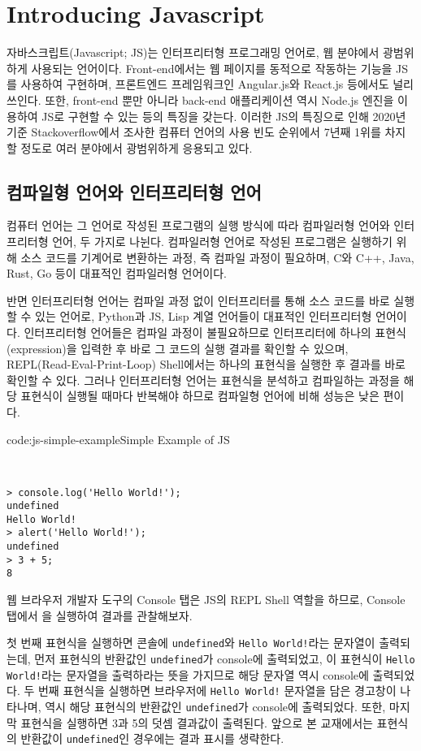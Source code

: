 \section{Introducing Javascript} \label{sect:introducing-javascript}

자바스크립트(Javascript; JS)는 인터프리터형 프로그래밍 언어로, 웹 분야에서 광범위하게 사용되는 언어이다. Front-end에서는 웹 페이지를 동적으로 작동하는 기능을 JS를 사용하여 구현하며, 프론트엔드 프레임워크인 Angular.js와 React.js 등에서도 널리 쓰인다. 또한, front-end 뿐만 아니라 back-end 애플리케이션 역시 Node.js 엔진을 이용하여 JS로 구현할 수 있는 등의 특징을 갖는다. 이러한 JS의 특징으로 인해 2020년 기준 Stackoverflow에서 조사한 컴퓨터 언어의 사용 빈도 순위에서 7년째 1위를 차지할 정도로 여러 분야에서 광범위하게 응용되고 있다.

\subsection*{컴파일형 언어와 인터프리터형 언어}

컴퓨터 언어는 그 언어로 작성된 프로그램의 실행 방식에 따라 컴파일러형 언어와 인터프리터형 언어, 두 가지로 나뉜다. 컴파일러형 언어로 작성된 프로그램은 실행하기 위해 소스 코드를 기계어로 변환하는 과정, 즉 컴파일 과정이 필요하며, C와 C++, Java, Rust, Go 등이 대표적인 컴파일러형 언어이다.

반면 인터프리터형 언어는 컴파일 과정 없이 인터프리터를 통해 소스 코드를 바로 실행할 수 있는 언어로, Python과 JS, Lisp 계열 언어들이 대표적인 인터프리터형 언어이다. 인터프리터형 언어들은 컴파일 과정이 불필요하므로 인터프리터에 하나의 표현식(expression)을 입력한 후 바로 그 코드의 실행 결과를 확인할 수 있으며, REPL(Read-Eval-Print-Loop) Shell에서는 하나의 표현식을 실행한 후 결과를 바로 확인할 수 있다. 그러나 인터프리터형 언어는 표현식을 분석하고 컴파일하는 과정을 해당 표현식이 실행될 때마다 반복해야 하므로 컴파일형 언어에 비해 성능은 낮은 편이다.

\begin{codeenv}{code:js-simple-example}{Simple Example of JS}\begin{verbatim}


> console.log('Hello World!');
undefined
Hello World!
> alert('Hello World!');
undefined
> 3 + 5;
8
\end{verbatim}
\end{codeenv}

웹 브라우저 개발자 도구의 Console 탭은 JS의 REPL Shell 역할을 하므로, Console 탭에서 을 실행하여 결과를 관찰해보자.

첫 번째 표현식을 실행하면 콘솔에 \texttt{undefined}와 \texttt{Hello World!}라는 문자열이 출력되는데, 먼저 표현식의 반환값인 \texttt{undefined}가 console에 출력되었고, 이 표현식이 \texttt{Hello World!}라는 문자열을 출력하라는 뜻을 가지므로 해당 문자열 역시 console에 출력되었다. 두 번째 표현식을 실행하면 브라우저에 \texttt{Hello World!} 문자열을 담은 경고창이 나타나며, 역시 해당 표현식의 반환값인 \texttt{undefined}가 console에 출력되었다. 또한, 마지막 표현식을 실행하면 3과 5의 덧셈 결과값이 출력된다. 앞으로 본 교재에서는 표현식의 반환값이 \texttt{undefined}인 경우에는 결과 표시를 생략한다.
